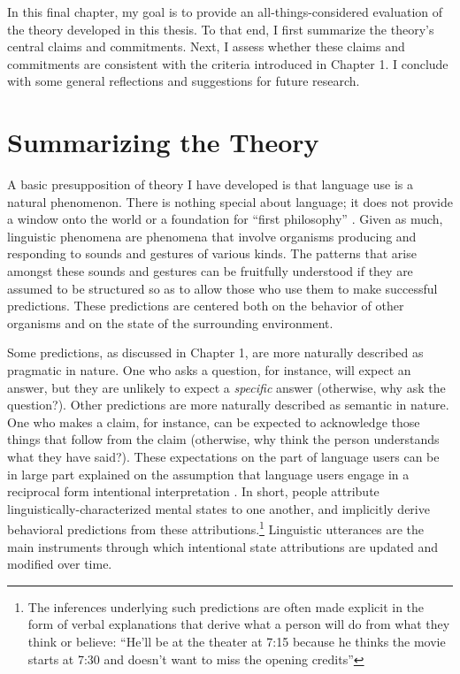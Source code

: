 In this final chapter, my goal is to provide an all-things-considered evaluation of the theory developed in this thesis. To that end, I first summarize the theory's central claims and commitments. Next, I assess whether these claims and commitments are consistent with the criteria introduced in Chapter 1. I conclude with some general reflections and suggestions for future research.  

\section{Summarizing the Theory}

A basic presupposition of theory I have developed is that language use is a natural phenomenon. There is nothing special about language; it does not provide a window onto the world or a foundation for ``first philosophy'' \citep[see][]{Stanley:2008}. Given as much, linguistic phenomena are phenomena that involve organisms producing and responding to sounds and gestures of various kinds. The patterns that arise amongst these sounds and gestures can be fruitfully understood if they are assumed to be structured so as to allow those who use them to make successful predictions. These predictions are centered both on the behavior of other organisms and on the state of the surrounding environment. 

Some predictions, as discussed in Chapter 1, are more naturally described as pragmatic in nature. One who asks a question, for instance, will expect an answer, but they are unlikely to expect a \textit{specific} answer (otherwise, why ask the question?). Other predictions are more naturally described as semantic in nature. One who makes a claim, for instance, can be expected to acknowledge those things that follow from the claim (otherwise, why think the person understands what they have said?). These expectations on the part of language users can be in large part explained on the assumption that language users engage in a reciprocal form intentional interpretation \citep{Brandom:1994,Dennett:1987}. In short, people attribute linguistically-characterized mental states to one another, and implicitly derive behavioral predictions from these attributions.\footnote{The inferences underlying such predictions are often made explicit in the form of verbal explanations that derive what a person will do from what they think or believe: ``He'll be at the theater at 7:15 because he thinks the movie starts at 7:30 and doesn't want to miss the opening credits''} Linguistic utterances are the main instruments through which intentional state attributions are updated and modified over time. 

